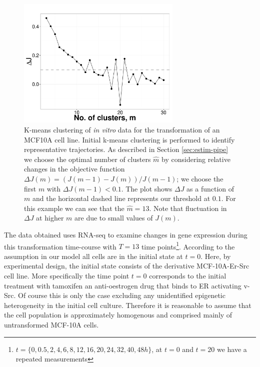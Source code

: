 \begin{figure}
  \centering
  \includegraphics[width=0.7\textwidth]{pics/kmeans-dat.pdf}
  \caption{K-means clustering of {\it in vitro} data for the transformation of an MCF10A cell line. Initial k-means clustering is performed to identify representative trajectories. As described in Section \ref{sec:estim-pipe} we choose the optimal number of clusters $\hat{m}$ by considering relative changes in the objective function $\Delta J (m) = (J(m-1) - J(m))/J(m-1)$; we choose the first $m$ with $\Delta J(m-1) < 0.1$. The plot shows $\Delta J$ as a function of $m$ and the horizontal dashed line represents our threshold at $0.1$. For this example we can see that the $\hat{m} = 13$. Note that fluctuation in $\Delta J$ at higher $m$ are due to small values of $J(m)$. }
  \label{fig:kmeans-dat}
\end{figure}

The data obtained uses RNA-seq to examine changes in gene expression during this transformation time-course with $T=13$ time points\footnote{$t=\lbrace 0, 0.5,  2,  4,  6,  8, 12, 16, 20, 24, 32, 40, 48h \rbrace$, at $t=0$ and $t=20$ we have a repeated measurements}. According to the assumption in our model all cells are in the initial state at $t=0$. Here, by experimental design, the initial state consists of the derivative MCF-10A-Er-Src cell line. More specifically the time point $t=0$ corresponds to the initial treatment with tamoxifen an anti-oestrogen drug that binds to ER activating v-Src. Of course this is only the case excluding any unidentified epigenetic heterogeneity in the initial cell culture.  Therefore it is reasonable to assume that the cell population is approximately homogenous and comprised mainly of untransformed MCF-10A cells.



